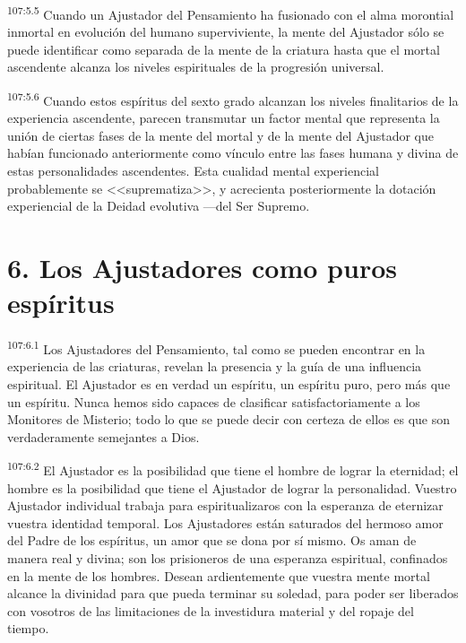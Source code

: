 \par
\textsuperscript{107:5.5} Cuando un Ajustador del Pensamiento ha fusionado con el alma morontial inmortal en evolución del humano superviviente, la mente del Ajustador sólo se puede identificar como separada de la mente de la criatura hasta que el mortal ascendente alcanza los niveles espirituales de la progresión universal.

\par
\textsuperscript{107:5.6} Cuando estos espíritus del sexto grado alcanzan los niveles finalitarios de la experiencia ascendente, parecen transmutar un factor mental que representa la unión de ciertas fases de la mente del mortal y de la mente del Ajustador que habían funcionado anteriormente como vínculo entre las fases humana y divina de estas personalidades ascendentes. Esta cualidad mental experiencial probablemente se <<suprematiza>>, y acrecienta posteriormente la dotación experiencial de la Deidad evolutiva ---del Ser Supremo.

\section*{6. Los Ajustadores como puros espíritus}
\par
\textsuperscript{107:6.1} Los Ajustadores del Pensamiento, tal como se pueden encontrar en la experiencia de las criaturas, revelan la presencia y la guía de una influencia espiritual. El Ajustador es en verdad un espíritu, un espíritu puro, pero más que un espíritu. Nunca hemos sido capaces de clasificar satisfactoriamente a los Monitores de Misterio; todo lo que se puede decir con certeza de ellos es que son verdaderamente semejantes a Dios.

\par
\textsuperscript{107:6.2} El Ajustador es la posibilidad que tiene el hombre de lograr la eternidad; el hombre es la posibilidad que tiene el Ajustador de lograr la personalidad. Vuestro Ajustador individual trabaja para espiritualizaros con la esperanza de eternizar vuestra identidad temporal. Los Ajustadores están saturados del hermoso amor del Padre de los espíritus, un amor que se dona por sí mismo. Os aman de manera real y divina; son los prisioneros de una esperanza espiritual, confinados en la mente de los hombres. Desean ardientemente que vuestra mente mortal alcance la divinidad para que pueda terminar su soledad, para poder ser liberados con vosotros de las limitaciones de la investidura material y del ropaje del tiempo.

